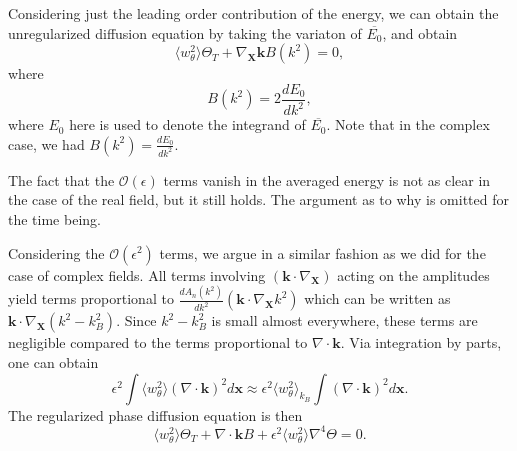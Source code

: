 \documentclass[12pt]{article}
\numberwithin{equation}{section}
\begin{document}
Considering just the leading order contribution of the energy, we can obtain the unregularized diffusion equation by taking the variaton of $\overline{E_0}$, and obtain
\begin{equation}
\langle w_{\theta}^2 \rangle \Theta_T + \nabla_{\bm{X}}\bm{k}B(k^2)=0,
\end{equation}
where
\begin{equation}
B(k^2) = 2\frac{dE_0}{dk^2},
\end{equation}
where $E_0$ here is used to denote the integrand of $\overline{E_0}$. Note that in the complex case, we had $B(k^2)=\frac{dE_0}{dk^2}$.
\par The fact that the $\mathcal{O}(\epsilon)$ terms vanish in the averaged energy is not as clear in the case of the real field, but it still holds. The argument as to why is omitted for the time being.
\par Considering the $\mathcal{O}(\epsilon^2)$ terms, we argue in a similar fashion as we did for the case of complex fields. All terms involving $(\bm{k}\cdot \nabla_{\bm{X}})$ acting on the amplitudes yield terms proportional to $\frac{dA_n(k^2)}{dk^2}(\bm{k}\cdot \nabla_{\bm{X}}k^2)$ which can be written as $\bm{k}\cdot \nabla_{\bm{X}}(k^2-k_B^2)$. Since $k^2-k_B^2$ is small almost everywhere, these terms are negligible compared to the terms proportional to $\nabla \cdot \bm{k}$. Via integration by parts, one can obtain
\begin{equation}
\epsilon^2 \int \langle w_{\theta}^2 \rangle (\nabla \cdot \bm{k})^2 d\bm{x} \approx \epsilon^2 \langle w_{\theta}^2 \rangle_{k_B}\int (\nabla \cdot \bm{k})^2 d\bm{x}.
\end{equation}
The regularized phase diffusion equation is then
\begin{equation}
\langle w_{\theta}^2 \rangle \Theta_T + \nabla \cdot \bm{k}B + \epsilon^2 \langle w_{\theta}^2 \rangle\nabla^4 \Theta = 0.
\end{equation}
\end{document}
